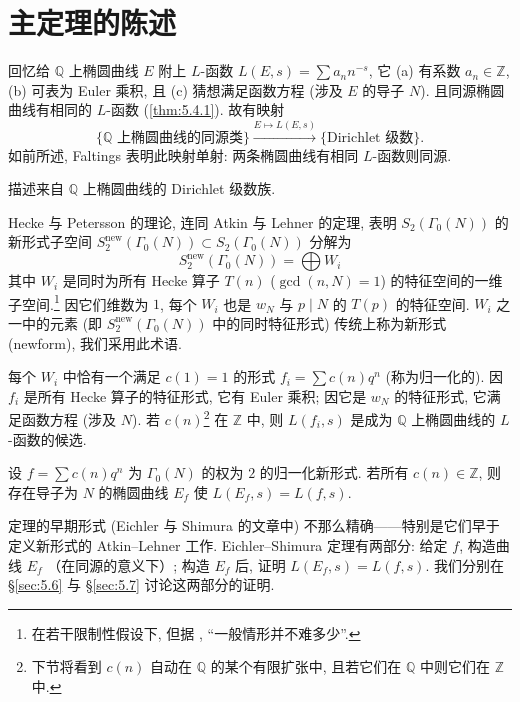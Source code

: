 \section{主定理的陈述}\label{sec:5.5}

回忆给 $\mathbb{Q}$ 上椭圆曲线 $E$ 附上 $L$-函数 $L(E, s) = \sum a_nn^{-s}$, 它 (a) 有系数 $a_n\in\mathbb{Z}$, (b) 可表为 Euler 乘积, 且 (c) 猜想满足函数方程 (涉及 $E$ 的导子 $N$). 且同源椭圆曲线有相同的 $L$-函数 (\ref{thm:5.4.1}). 故有映射
\[
\{\mathbb{Q} \text{ 上椭圆曲线的同源类}\}\xrightarrow{E\mapsto L(E,s)}\{\text{Dirichlet 级数}\}.
\]
如前所述, Faltings \cite{faltings1983} 表明此映射单射: 两条椭圆曲线有相同 $L$-函数则同源.

\begin{question} \label{thm:5.5.1} 
描述来自 $\mathbb{Q}$ 上椭圆曲线的 Dirichlet 级数族.
\end{question}

Hecke 与 Petersson 的理论, 连同 Atkin 与 Lehner 的定理, 表明 $S_2(\Gamma_0(N))$ 的新形式子空间 $S_2^{\mathrm{new}}(\Gamma_0(N))\subset S_2(\Gamma_0(N))$ 分解为
\[
S_2^{\mathrm{new}}(\Gamma_0(N)) = \bigoplus W_i
\]
其中 $W_i$ 是同时为所有 Hecke 算子 $T(n)$ ($\gcd(n, N) = 1$) 的特征空间的一维子空间.\footnote{在若干限制性假设下, 但据 \cite[p.~302]{deligne1974}, ``一般情形并不难多少''.} 因它们维数为 $1$, 每个 $W_i$ 也是 $w_N$ 与 $p\mid N$ 的 $T(p)$ 的特征空间. $W_i$ 之一中的元素 (即 $S_2^{\mathrm{new}}(\Gamma_0(N))$ 中的同时特征形式) 传统上称为新形式 (newform), 我们采用此术语.

每个 $W_i$ 中恰有一个满足 $c(1) = 1$ 的形式 $f_i = \sum c(n)q^n$ (称为归一化的). 因 $f_i$ 是所有 Hecke 算子的特征形式, 它有 Euler 乘积; 因它是 $w_N$ 的特征形式, 它满足函数方程 (涉及 $N$). 若 $c(n)$\footnote{下节将看到 $c(n)$ 自动在 $\mathbb{Q}$ 的某个有限扩张中, 且若它们在 $\mathbb{Q}$ 中则它们在 $\mathbb{Z}$ 中.} 在 $\mathbb{Z}$ 中, 则 $L(f_i, s)$ 是成为 $\mathbb{Q}$ 上椭圆曲线的 $L$-函数的候选.

\begin{theorem} \label{thm:5.5.2} 
设 $f = \sum c(n)q^n$ 为 $\Gamma_0(N)$ 的权为 $2$ 的归一化新形式. 若所有 $c(n)\in\mathbb{Z}$, 则存在导子为 $N$ 的椭圆曲线 $E_f$ 使 $L(E_f, s) = L(f, s)$.
\end{theorem}

定理的早期形式 (Eichler 与 Shimura 的文章中) 不那么精确——特别是它们早于定义新形式的 Atkin--Lehner 工作. Eichler--Shimura 定理有两部分: 给定 $f$, 构造曲线 $E_f$ （在同源的意义下）; 构造 $E_f$ 后, 证明 $L(E_f, s) = L(f, s)$. 我们分别在 \S\ref{sec:5.6} 与 \S\ref{sec:5.7} 讨论这两部分的证明.

